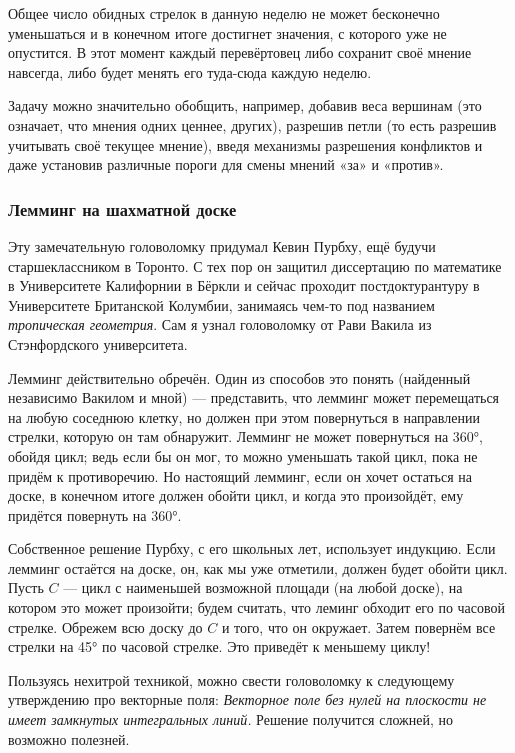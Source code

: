 Общее число обидных стрелок в данную неделю не может бесконечно уменьшаться и в конечном итоге достигнет значения, с которого уже не опустится.
В этот момент каждый перевёртовец либо сохранит своё мнение навсегда, либо будет менять его туда-сюда каждую неделю.

\medskip

Задачу можно значительно обобщить, например, добавив веса вершинам (это означает, что мнения одних ценнее, других), разрешив петли (то есть разрешив учитывать своё текущее мнение), введя механизмы разрешения конфликтов и даже установив различные пороги для смены мнений «за» и «против».

\subsubsection*{Лемминг на шахматной доске}

Эту замечательную головоломку придумал Кевин Пурбху, ещё будучи старшеклассником в Торонто.
С тех пор он защитил диссертацию по математике в Университете Калифорнии в Бёркли и
сейчас проходит постдоктурантуру в Университете Британской Колумбии,
занимаясь чем-то под названием \emph{тропическая геометрия}.
Сам я узнал головоломку от Рави Вакила из Стэнфордского университета.

Лемминг действительно обречён.
Один из способов это понять (найденный независимо Вакилом и мной) --- представить, что лемминг может перемещаться на любую соседнюю клетку, но должен при этом повернуться в направлении стрелки, которую он там обнаружит.
Лемминг не может повернуться на 360°, обойдя цикл;
ведь если бы он мог, то можно уменьшать такой цикл, пока не придём к противоречию.
Но настоящий лемминг, если он хочет остаться на доске, в конечном итоге должен обойти цикл, и когда это произойдёт, ему придётся повернуть на 360°.

Собственное решение Пурбху, с его школьных лет, использует индукцию.
Если лемминг остаётся на доске, он, как мы уже отметили, должен будет обойти цикл.
Пусть $C$ --- цикл с наименьшей возможной площади (на любой доске), на котором это может произойти; будем считать, что леминг обходит его по часовой стрелке.
Обрежем всю доску до $C$ и того, что он окружает.
Затем повернём все стрелки на 45° по часовой стрелке.
Это приведёт к меньшему циклу!

\begin{addedbytheeditors}
Пользуясь нехитрой техникой, можно свести головоломку к следующему утверждению про векторные поля: \emph{Векторное поле без нулей на плоскости не имеет замкнутых интегральных линий.}
Решение получится сложней, но возможно полезней.
\end{addedbytheeditors}
